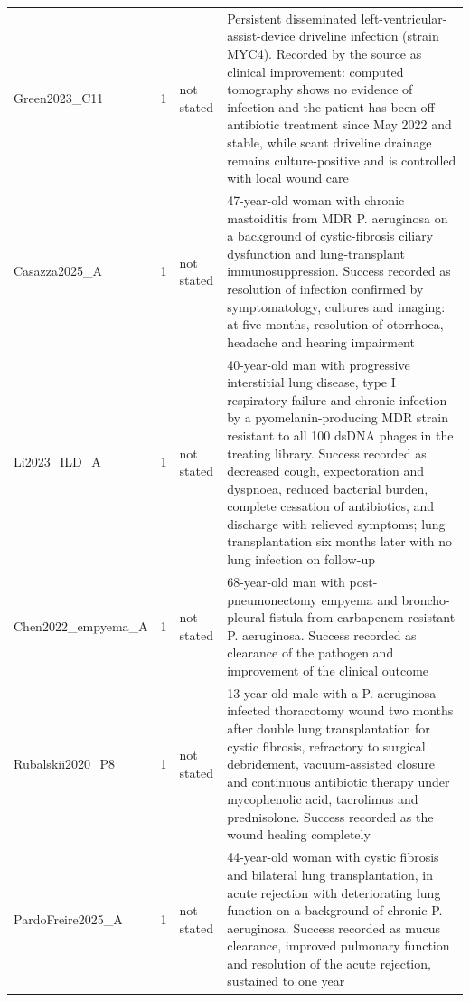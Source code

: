 \begin{tabular}{p{2.6cm}cp{1.5cm}p{8.4cm}}
Green2023\_C11 & 1 & not stated & Persistent disseminated left-ventricular-assist-device driveline infection (strain MYC4). Recorded by the source as clinical improvement: computed tomography shows no evidence of infection and the patient has been off antibiotic treatment since May 2022 and stable, while scant driveline drainage remains culture-positive and is controlled with local wound care \\
Casazza2025\_A & 1 & not stated & 47-year-old woman with chronic mastoiditis from MDR P. aeruginosa on a background of cystic-fibrosis ciliary dysfunction and lung-transplant immunosuppression. Success recorded as resolution of infection confirmed by symptomatology, cultures and imaging: at five months, resolution of otorrhoea, headache and hearing impairment \\
Li2023\_ILD\_A & 1 & not stated & 40-year-old man with progressive interstitial lung disease, type I respiratory failure and chronic infection by a pyomelanin-producing MDR strain resistant to all 100 dsDNA phages in the treating library. Success recorded as decreased cough, expectoration and dyspnoea, reduced bacterial burden, complete cessation of antibiotics, and discharge with relieved symptoms; lung transplantation six months later with no lung infection on follow-up \\
Chen2022\_empyema\_A & 1 & not stated & 68-year-old man with post-pneumonectomy empyema and broncho-pleural fistula from carbapenem-resistant P. aeruginosa. Success recorded as clearance of the pathogen and improvement of the clinical outcome \\
Rubalskii2020\_P8 & 1 & not stated & 13-year-old male with a P. aeruginosa-infected thoracotomy wound two months after double lung transplantation for cystic fibrosis, refractory to surgical debridement, vacuum-assisted closure and continuous antibiotic therapy under mycophenolic acid, tacrolimus and prednisolone. Success recorded as the wound healing completely \\
PardoFreire2025\_A & 1 & not stated & 44-year-old woman with cystic fibrosis and bilateral lung transplantation, in acute rejection with deteriorating lung function on a background of chronic P. aeruginosa. Success recorded as mucus clearance, improved pulmonary function and resolution of the acute rejection, sustained to one year \\
\bottomrule
\end{tabular}
